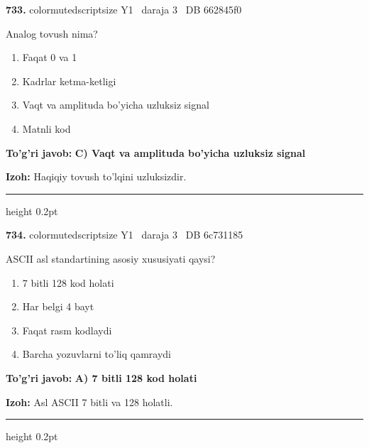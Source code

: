 \documentclass[10pt,a4paper,oneside]{article}
\begin{document}
\noindent\textbf{\color{ink}733.}  {color{muted}scriptsize Y1 \textbullet\ daraja 3 \textbullet\ DB 662845f0}
\par
Analog tovush nima?
\begin{enumerate}[label=\Alph*),leftmargin=9mm]
\item Faqat 0 va 1
\item Kadrlar ketma-ketligi
\item Vaqt va amplituda bo'yicha uzluksiz signal
\item Matnli kod
\end{enumerate}
\begin{tcolorbox}[enhanced,breakable,colback=teal!4,colframe=teal!50!black,boxrule=0.5pt,arc=1.1mm,left=3mm,right=3mm,top=1.7mm,bottom=1.7mm,before skip=2mm,after skip=2mm]
\textbf{\color{teal}To'g'ri javob:} \textbf{C) Vaqt va amplituda bo'yicha uzluksiz signal}
\par\smallskip
\textbf{Izoh:} Haqiqiy tovush to'lqini uzluksizdir.
\end{tcolorbox}
\vspace{2mm}\hrule height 0.2pt \vspace{3mm}

\noindent\textbf{\color{ink}734.}  {color{muted}scriptsize Y1 \textbullet\ daraja 3 \textbullet\ DB 6c731185}
\par
ASCII asl standartining asosiy xususiyati qaysi?
\begin{enumerate}[label=\Alph*),leftmargin=9mm]
\item 7 bitli 128 kod holati
\item Har belgi 4 bayt
\item Faqat rasm kodlaydi
\item Barcha yozuvlarni to'liq qamraydi
\end{enumerate}
\begin{tcolorbox}[enhanced,breakable,colback=teal!4,colframe=teal!50!black,boxrule=0.5pt,arc=1.1mm,left=3mm,right=3mm,top=1.7mm,bottom=1.7mm,before skip=2mm,after skip=2mm]
\textbf{\color{teal}To'g'ri javob:} \textbf{A) 7 bitli 128 kod holati}
\par\smallskip
\textbf{Izoh:} Asl ASCII 7 bitli va 128 holatli.
\end{tcolorbox}
\vspace{2mm}\hrule height 0.2pt \vspace{3mm}
\end{document}
